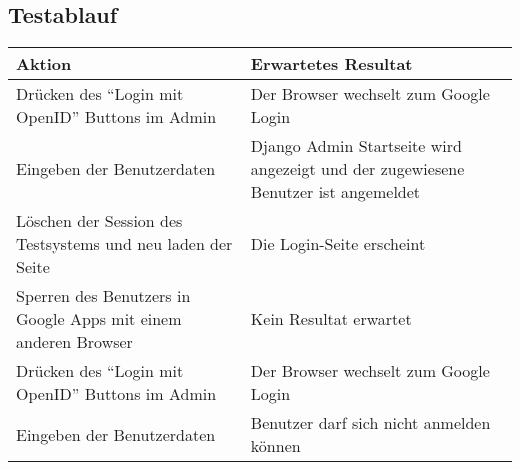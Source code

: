 \subsection{Testablauf}
\label{sub:testablauf}
\begin{tabular}{p{7cm} p{7cm}}
Aktion & Erwartetes Resultat\\
\hline
Drücken des ``Login mit OpenID'' Buttons im Admin & Der Browser wechselt zum Google Login\\
Eingeben der Benutzerdaten & Django Admin Startseite wird angezeigt und der zugewiesene Benutzer ist angemeldet\\
Löschen der Session des Testsystems und neu laden der Seite & Die Login-Seite erscheint\\
Sperren des Benutzers in Google Apps mit einem anderen Browser & Kein Resultat erwartet\\
Drücken des ``Login mit OpenID'' Buttons im Admin & Der Browser wechselt zum Google Login\\
Eingeben der Benutzerdaten & Benutzer darf sich nicht anmelden können\\
\end{tabular}
